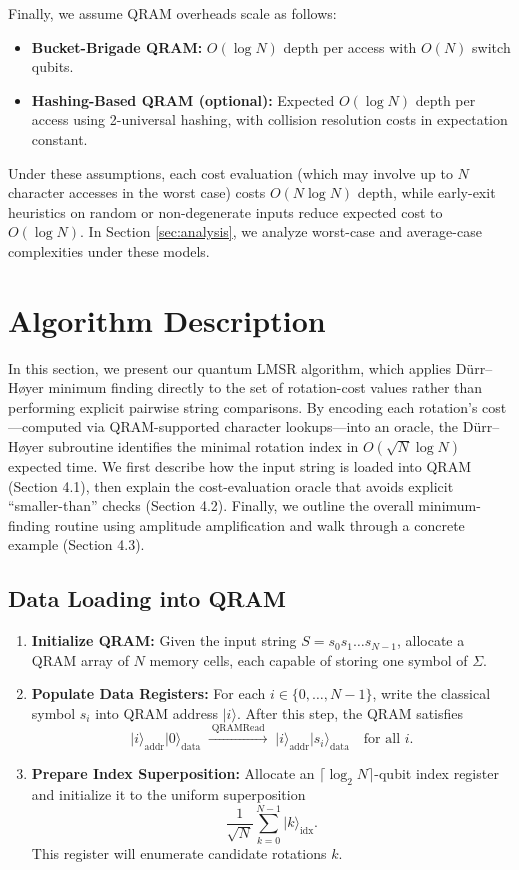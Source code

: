 \documentclass[11pt,letterpaper]{article}
\begin{document}
Finally, we assume QRAM overheads scale as follows:
\begin{itemize}
    \item \textbf{Bucket-Brigade QRAM:} \(O(\log N)\) depth per access with \(O(N)\) switch qubits.
    \item \textbf{Hashing-Based QRAM (optional):} Expected \(O(\log N)\) depth per access using 2-universal hashing, with collision resolution costs in expectation constant.
\end{itemize}
Under these assumptions, each cost evaluation (which may involve up to \(N\) character accesses in the worst case) costs \(O(N\log N)\) depth, while early-exit heuristics on random or non-degenerate inputs reduce expected cost to \(O(\log N)\). In Section \ref{sec:analysis}, we analyze worst-case and average-case complexities under these models.

\section{Algorithm Description}
\label{sec:algorithm}

In this section, we present our quantum LMSR algorithm, which applies D{\"u}rr--H{\o}yer minimum finding directly to the set of rotation-cost values rather than performing explicit pairwise string comparisons. By encoding each rotation's cost---computed via QRAM-supported character lookups---into an oracle, the D{\"u}rr--H{\o}yer subroutine identifies the minimal rotation index in \(O(\sqrt{N}\log N)\) expected time. We first describe how the input string is loaded into QRAM (Section 4.1), then explain the cost-evaluation oracle that avoids explicit ``smaller-than'' checks (Section 4.2). Finally, we outline the overall minimum-finding routine using amplitude amplification and walk through a concrete example (Section 4.3).

\subsection{Data Loading into QRAM}
\label{sec:algorithm:qram}
\begin{enumerate}
    \item \textbf{Initialize QRAM:} Given the input string \(S = s_{0}s_{1}\dots s_{N-1}\), allocate a QRAM array of \(N\) memory cells, each capable of storing one symbol of \(\Sigma\).  
    \item \textbf{Populate Data Registers:} For each \(i\in\{0,\dots,N-1\}\), write the classical symbol \(s_{i}\) into QRAM address \(\lvert i\rangle\). After this step, the QRAM satisfies
    \[
      \lvert i\rangle_{\text{addr}} \lvert 0\rangle_{\text{data}}
      \;\xrightarrow{\;\mathrm{QRAMRead}\;}\;
      \lvert i\rangle_{\text{addr}} \lvert s_{i}\rangle_{\text{data}}
      \quad \text{for all } i.
    \]
    \item \textbf{Prepare Index Superposition:} Allocate an \(\lceil\log_{2}N\rceil\)-qubit index register and initialize it to the uniform superposition
    \[
      \frac{1}{\sqrt{N}}\sum_{k=0}^{N-1}\lvert k\rangle_{\text{idx}}.
    \]
    This register will enumerate candidate rotations \(k\).
\end{enumerate}
\end{document}
